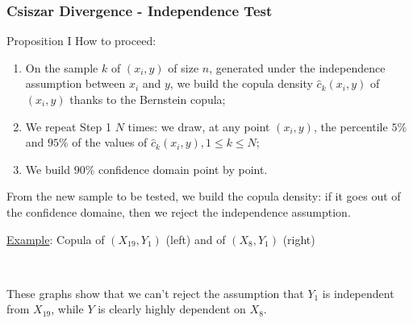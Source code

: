 \documentclass[8pt]{beamer}
\begin{document}
\begin{frame}
  \frametitle{Csiszar Divergence - Independence Test}
  \small
  
  \begin{block}{Proposition I}
   How to proceed: 
   \begin{enumerate}
    \item On the sample $k$ of $(x_i, y)$ of size $n$, generated under the independence assumption between $x_i$ and $y$, we build the copula density $\hat{c}_k(x_i,y)$  of $(x_i,y)$ thanks to the Bernstein copula;
    \item We repeat Step 1  $N$ times: we draw, at any point $(x_i,y)$, the percentile $5\%$ and $95\%$ of the values of $\hat{c}_k(x_i,y), 1\leq k \leq N$;
    \item We build \alert{$90\%$ confidence domain} point by point.
   \end{enumerate}
From the new sample to be tested, we build the copula density: if it goes out of the confidence domaine, then we reject the independence assumption.
  \end{block}

 \underline{Example}: Copula of $(X_{19}, Y_1)$ (left) and of $(X_8, Y_1)$ (right)
\begin{center}
    \, 
  \end{center}
  These graphs show that we can't reject the assumption that $Y_1$ is independent from $X_{19}$, while $Y$ is clearly highly dependent on $X_8$.
  \end{frame}
  
\end{document}
